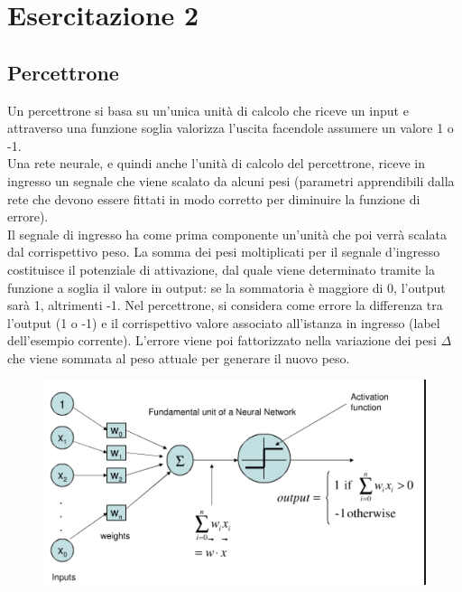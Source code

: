 \section{Esercitazione 2}
\subsection{Percettrone}
Un percettrone si basa su un’unica unità di calcolo che riceve un input e attraverso una funzione soglia valorizza l’uscita facendole assumere un valore 1 o -1.\\
Una rete neurale, e quindi anche l’unità di calcolo del percettrone, riceve in ingresso un segnale che viene scalato da alcuni pesi (parametri apprendibili dalla rete che devono essere fittati in modo corretto per diminuire la funzione di errore).\\

Il segnale di ingresso ha come prima componente un’unità che poi verrà scalata dal corrispettivo peso. 
La somma dei pesi moltiplicati per il segnale d’ingresso costituisce il potenziale di attivazione, dal quale viene determinato tramite la funzione a soglia il valore in output: se la sommatoria è maggiore di 0, l’output sarà 1, altrimenti -1. 
Nel percettrone, si considera come errore la differenza tra l’output (1 o -1) e il corrispettivo valore associato all’istanza in ingresso (label dell’esempio corrente).
L’errore viene poi fattorizzato nella variazione dei pesi $\Delta$ che viene sommata al peso attuale per generare il nuovo peso.

\begin{figure}[H]
    \centering
    \includegraphics[scale = 0.8]{imm/perceptron_1.png}
\end{figure}

